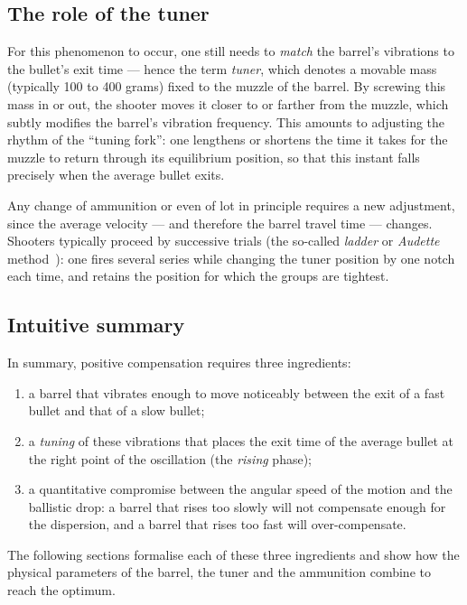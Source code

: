 \documentclass[12pt,a4paper]{article}
\begin{document}
	\subsection{The role of the tuner}

	For this phenomenon to occur, one still needs to \emph{match} the barrel's vibrations to the bullet's exit time --- hence the term \emph{tuner}, which denotes a movable mass (typically 100 to 400 grams) fixed to the muzzle of the barrel. By screwing this mass in or out, the shooter moves it closer to or farther from the muzzle, which subtly modifies the barrel's vibration frequency. This amounts to adjusting the rhythm of the ``tuning fork'': one lengthens or shortens the time it takes for the muzzle to return through its equilibrium position, so that this instant falls precisely when the average bullet exits.

	Any change of ammunition or even of lot in principle requires a new adjustment, since the average velocity --- and therefore the barrel travel time --- changes. Shooters typically proceed by successive trials (the so-called \emph{ladder} or \emph{Audette} method~\cite{Audette}): one fires several series while changing the tuner position by one notch each time, and retains the position for which the groups are tightest.

	\subsection{Intuitive summary}

	In summary, positive compensation requires three ingredients:
	\begin{enumerate}
		\item a barrel that vibrates enough to move noticeably between the exit of a fast bullet and that of a slow bullet;
		\item a \emph{tuning} of these vibrations that places the exit time of the average bullet at the right point of the oscillation (the \emph{rising} phase);
		\item a quantitative compromise between the angular speed of the motion and the ballistic drop: a barrel that rises too slowly will not compensate enough for the dispersion, and a barrel that rises too fast will over-compensate.
	\end{enumerate}
	The following sections formalise each of these three ingredients and show how the physical parameters of the barrel, the tuner and the ammunition combine to reach the optimum.
\end{document}

